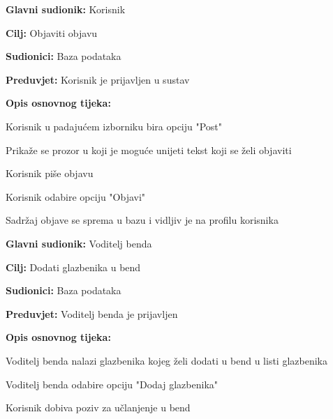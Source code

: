 	\noindent {}
	\begin{packed_item}
		
		\item \textbf{Glavni sudionik: } Korisnik
		\item  \textbf{Cilj:} Objaviti objavu
		\item  \textbf{Sudionici:} Baza podataka
		\item  \textbf{Preduvjet:} Korisnik je prijavljen u sustav
		\item  \textbf{Opis osnovnog tijeka:}
		
		\item[] \begin{packed_enum}
			
			\item Korisnik u padajućem izborniku bira opciju "Post"
			\item Prikaže se prozor u koji je moguće unijeti tekst koji se želi objaviti 
			\item Korisnik piše objavu
			\item Korisnik odabire opciju "Objavi"
			\item Sadržaj objave se sprema u bazu i vidljiv je na profilu korisnika
		\end{packed_enum}
	\end{packed_item}

	\noindent \underbar{\textbf{UC23 - Poziv u bend}}
	\begin{packed_item}
		
		\item \textbf{Glavni sudionik: } Voditelj benda
		\item  \textbf{Cilj:} Dodati glazbenika u bend
		\item  \textbf{Sudionici:} Baza podataka
		\item  \textbf{Preduvjet:} Voditelj benda je prijavljen 
		\item  \textbf{Opis osnovnog tijeka:} 
		
		\item[] \begin{packed_enum}
			\item Voditelj benda nalazi glazbenika kojeg želi dodati u bend u listi glazbenika
			\item Voditelj benda odabire opciju "Dodaj glazbenika" 
			\item Korisnik dobiva poziv za učlanjenje u bend
		\end{packed_enum}
		
	\end{packed_item}	

